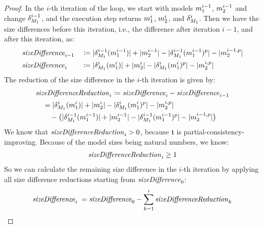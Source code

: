 \begin{proof}
    In the $i$-th iteration of the loop, we start with models $\model{m}{1}^{i-1}$, $\model{m}{2}^{i-1}$ and change $\change{\metamodel{M}{1}}^{i-1}$, and the execution step returns $\model{m}{1}^{i}$, $\model{m}{2}^{i}$, and $\change{\metamodel{M}{1}}^{i}$.
    Then we have the size differences before this iteration, i.e., the difference after iteration $i-1$, and after this iteration, as:
    \begin{alignat*}{2}
        &
        \mathvariable{sizeDifference}_{i-1} &&\equalsperdefinition \abs{\change{\metamodel{M}{1}}^{i-1}(\model{m}{1}^{i-1})} + \abs{\model{m}{2}^{i-1}} - \abs{\change{\metamodel{M}{1}}^{i-1}(\model{m}{1}^{i-1})^p} - \abs{\model{m}{2}^{i-1, p}} \\
        &
        \mathvariable{sizeDifference}_{i} &&\equalsperdefinition \abs{\change{\metamodel{M}{1}}^{i}(\model{m}{1}^{i})} + \abs{\model{m}{2}^{i}} - \abs{\change{\metamodel{M}{1}}^{i}(\model{m}{1}^{i})^p} - \abs{\model{m}{2}^{i,p}}
    \end{alignat*}
    The reduction of the size difference in the $i$-th iteration is given by:
    \begin{align*}
        & 
        \mathvariable{sizeDifferenceReduction}_{i} \equalsperdefinition \mathvariable{sizeDifference}_{i} - \mathvariable{sizeDifference}_{i-1} \\
        &  \formulaskip
        = \abs{\change{\metamodel{M}{1}}^{i}(\model{m}{1}^{i})} + \abs{\model{m}{2}^{i}} - \abs{\change{\metamodel{M}{1}}^{i}(\model{m}{1}^{i})^p} - \abs{\model{m}{2}^{i,p}} \\
        & \formulaskip\formulaskip
        - \big(\abs{\change{\metamodel{M}{1}}^{i-1}(\model{m}{1}^{i-1})} + \abs{\model{m}{2}^{i-1}} - \abs{\change{\metamodel{M}{1}}^{i-1}(\model{m}{1}^{i-1})^p} - \abs{\model{m}{2}^{i-1,p}}\big)
    \end{align*}
    We know that $\mathit{sizeDifferenceReduction}_{i} > 0$, because $\transformation{t}$ is partial-consistency-improving.
    Because of the model sizes being natural numbers, we know:
    \begin{align*}
        \mathit{sizeDifferenceReduction}_{i} \geq 1
    \end{align*}
    So we can calculate the remaining size difference in the $i$-th iteration by applying all size difference reductions starting from $\mathit{sizeDifference}_0$:
    \begin{align*}
        \mathvariable{sizeDifference}_{i} \; & 
        =  \mathvariable{sizeDifference}_{0} - \sum_{k=1}^{i} \mathvariable{sizeDifferenceReduction}_{k} \\

\end{align*}
\end{proof}
